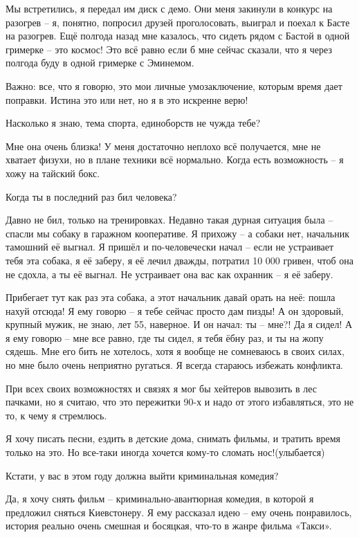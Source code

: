 Мы встретились, я передал им диск с демо. Они меня закинули в конкурс на
разогрев – я, понятно, попросил друзей проголосовать, выиграл и поехал к Басте
на разогрев. Ещё полгода назад мне казалось, что сидеть рядом с Бастой в одной
гримерке – это космос! Это всё равно если б мне сейчас сказали, что я через
полгода буду в одной гримерке с Эминемом.

Важно: все, что я говорю, это мои личные умозаключение, которым время дает
поправки. Истина это или нет, но я в это искренне верю!

Насколько я знаю, тема спорта, единоборств не чужда тебе?

Мне она очень близка! У меня  достаточно неплохо всё получается, мне не хватает
физухи, но в плане техники всё нормально. Когда есть возможность – я хожу на
тайский бокс.

Когда ты в последний раз бил человека?

Давно не бил, только на тренировках. Недавно такая дурная ситуация была –
спасли мы собаку в гаражном кооперативе. Я прихожу – а собаки нет, начальник
тамошний её выгнал. Я пришёл и по-человечески начал – если не устраивает тебя
эта собака, я её заберу, я её лечил дважды, потратил 10 000 гривен, чтоб она не
сдохла, а ты её выгнал. Не устраивает она вас как охранник – я её заберу.

Прибегает тут как раз эта собака, а этот начальник давай орать на неё: пошла
нахуй отсюда! Я ему говорю – я тебе сейчас просто дам пизды! А он здоровый,
крупный мужик, не знаю, лет 55, наверное. И он начал: ты – мне?! Да я сидел! А
я ему говорю – мне все равно, где ты сидел, я тебя ёбну раз, и ты на жопу
сядешь. Мне его бить не хотелось, хотя я вообще не сомневаюсь в своих силах, но
мне было очень неприятно ругаться. Я всегда стараюсь избежать конфликта.

При всех своих возможностях и связях я мог бы хейтеров вывозить в лес пачками,
но я считаю, что это пережитки 90-х и надо от этого избавляться, это не то, к
чему я стремлюсь.

Я хочу писать песни, ездить в детские дома, снимать фильмы, и тратить время
только на это. Но все-таки иногда хочется кому-то сломать нос!(улыбается)

Кстати, у вас в этом году должна выйти криминальная комедия?

Да, я хочу снять фильм – криминально-авантюрная комедия, в которой я предложил
сняться Киевстонеру. Я ему рассказал идею – ему очень понравилось, история
реально очень смешная и босяцкая, что-то в жанре фильма «Такси».

